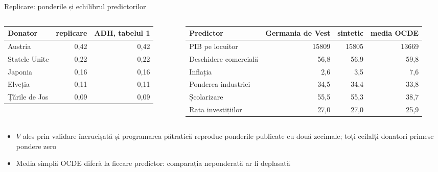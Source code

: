 \begin{frame}{Replicare: ponderile și echilibrul predictorilor}
\itemsize{\small}
\begin{columns}[T]
\begin{column}{0.38\textwidth}
\begin{center}
\footnotesize
\begin{tabular}{lrr}
\toprule
\textbf{Donator} & \textbf{replicare} & \textbf{ADH, tabelul 1} \\
\midrule
Austria & 0{,}42 & 0{,}42 \\
Statele Unite & 0{,}22 & 0{,}22 \\
Japonia & 0{,}16 & 0{,}16 \\
Elveția & 0{,}11 & 0{,}11 \\
Țările de Jos & 0{,}09 & 0{,}09 \\
\bottomrule
\end{tabular}
\end{center}

\end{column}
\begin{column}{0.6\textwidth}
\begin{center}
\footnotesize
\begin{tabular}{lrrr}
\toprule
\textbf{Predictor} & \textbf{Germania de Vest} & \textbf{sintetic} & \textbf{media OCDE} \\
\midrule
PIB pe locuitor & 15809 & 15805 & 13669 \\
Deschidere comercială & 56{,}8 & 56{,}9 & 59{,}8 \\
Inflația & 2{,}6 & 3{,}5 & 7{,}6 \\
Ponderea industriei & 34{,}5 & 34{,}4 & 33{,}8 \\
Școlarizare & 55{,}5 & 55{,}3 & 38{,}7 \\
Rata investițiilor & 27{,}0 & 27{,}0 & 25{,}9 \\
\bottomrule
\end{tabular}
\end{center}

\end{column}
\end{columns}\begin{itemize}
    \item $V$ ales prin validare încrucișată și programarea pătratică reproduc ponderile publicate cu două zecimale; toți ceilalți donatori primesc pondere zero
    \item Media simplă OCDE diferă la fiecare predictor: comparația neponderată ar fi deplasată
\end{itemize}
\end{frame}

